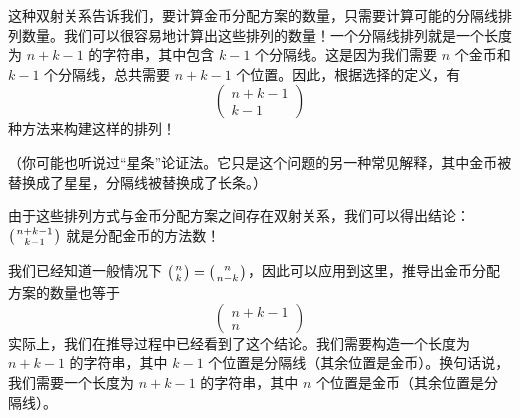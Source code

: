 这种双射关系告诉我们，要计算金币分配方案的数量，只需要计算可能的分隔线排列数量。我们可以很容易地计算出这些排列的数量！一个分隔线排列就是一个长度为 $n + k - 1$ 的字符串，其中包含 $k - 1$ 个分隔线。这是因为我们需要 $n$ 个金币和 $k - 1$ 个分隔线，总共需要 $n + k - 1$ 个位置。因此，根据选择的定义，有
\[\begin{pmatrix}n+k-1 \\k-1\end{pmatrix}\]
种方法来构建这样的排列！

（你可能也听说过``星条''论证法。它只是这个问题的另一种常见解释，其中金币被替换成了星星，分隔线被替换成了长条。）

由于这些排列方式与金币分配方案之间存在双射关系，我们可以得出结论：$\big({n+k-1 \atop k-1}\big)$ 就是分配金币的方法数！

我们已经知道一般情况下 $\big({n \atop k}\big) = \big({n \atop n-k}\big)$，因此可以应用到这里，推导出金币分配方案的数量也等于
\[\begin{pmatrix}n+k-1 \\n\end{pmatrix}\]
实际上，我们在推导过程中已经看到了这个结论。我们需要构造一个长度为 $n+k-1$ 的字符串，其中 $k-1$ 个位置是分隔线（其余位置是金币）。换句话说，我们需要一个长度为 $n+k-1$ 的字符串，其中 $n$ 个位置是金币（其余位置是分隔线）。
